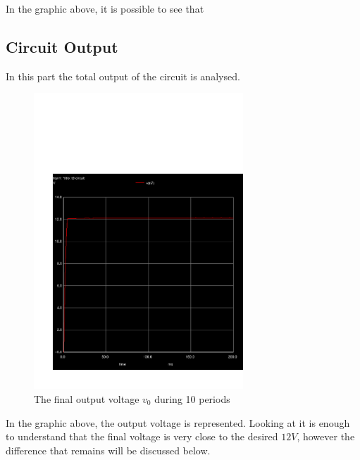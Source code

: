 In the graphic above, it is possible to see that

\subsection{Circuit Output}

In this part the total output of the circuit is analysed.

\begin{figure}[H]\centering
\includegraphics[trim= 0cm 0cm 0cm 10cm, clip, width=0.7\textwidth]{trans2.pdf}
\caption{The final output voltage $v_0$ during 10 periods}
\label{fig:sim_output}
\end{figure}

In the graphic above, the output voltage is represented. Looking at it is enough to understand that the final voltage is very close to the desired $12V$, however the difference that remains will be discussed below.

